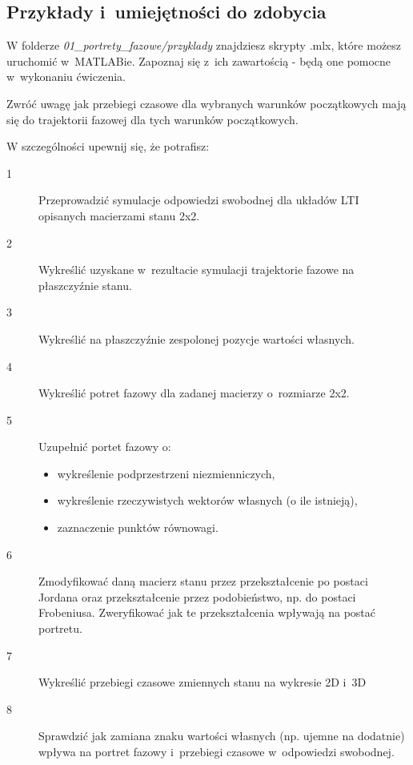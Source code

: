 \documentclass{sprawozdanie-agh}
\begin{document}
\subsection{Przykłady i~umiejętności do zdobycia}
W folderze \textit{01\_portrety\_fazowe/przyklady} znajdziesz skrypty .mlx, które możesz uruchomić w~MATLABie. Zapoznaj się z~ich zawartością - będą one pomocne w~wykonaniu ćwiczenia. 

Zwróć uwagę jak przebiegi czasowe dla wybranych warunków początkowych mają się do trajektorii fazowej dla tych warunków początkowych.


W szczególności upewnij się, że potrafisz:
\begin{description}
\item[1] Przeprowadzić symulacje odpowiedzi swobodnej dla układów LTI opisanych macierzami stanu 2x2.
\item[2] Wykreślić uzyskane w~rezultacie symulacji trajektorie fazowe na płaszczyźnie stanu.
\item[3] Wykreślić na płaszczyźnie zespolonej pozycje wartości własnych.
\item[4] Wykreślić potret fazowy dla zadanej macierzy o~rozmiarze 2x2.
\item[5] Uzupełnić portet fazowy o:
        \begin{itemize}
        \item wykreślenie podprzestrzeni niezmienniczych,
        \item wykreślenie rzeczywistych wektorów własnych (o ile istnieją),
        \item zaznaczenie punktów równowagi.
        \end{itemize}
\item[6] Zmodyfikować daną macierz stanu przez przekształcenie po postaci Jordana oraz przekształcenie przez podobieństwo, np. do postaci Frobeniusa. Zweryfikować jak te przekształcenia wpływają na postać portretu.
\item[7] Wykreślić przebiegi czasowe zmiennych stanu na wykresie 2D i~3D
\item[8] Sprawdzić jak zamiana znaku wartości własnych (np. ujemne na dodatnie) wpływa na portret fazowy i~przebiegi czasowe w~odpowiedzi swobodnej.
\end{description}

\vspace{0.5cm}
\par

\end{document}
